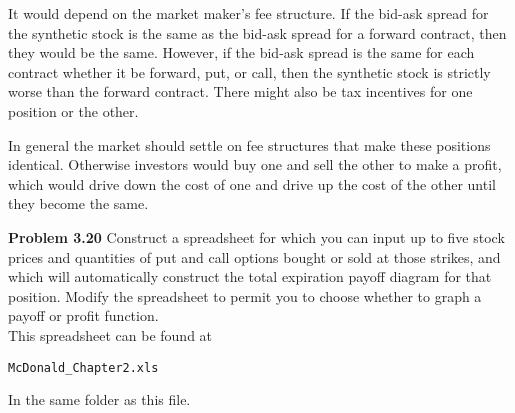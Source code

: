 \documentclass[12pt]{article}
\newcommand{\problem}[1]{\bigskip \noindent \textbf{Problem #1}}
\theoremstyle{plain}
\begin{document}
\begin{enumerate}[(a)]
It would depend on the market maker's fee structure. If the bid-ask spread for the synthetic stock is the same as the bid-ask spread for a forward contract, then they would be the same. However, if the bid-ask spread is the same for each contract whether it be forward, put, or call, then the synthetic stock is strictly worse than the forward contract. There might also be tax incentives for one position or the other.

In general the market should settle on fee structures that make these positions identical. Otherwise investors would buy one and sell the other to make a profit, which would drive down the cost of one and drive up the cost of the other until they become the same.
\end{enumerate}

\problem{3.20} Construct a spreadsheet for which you can input up to five stock prices and quantities of put and call options bought or sold at those strikes, and which will automatically construct the total expiration payoff diagram for that position. Modify the spreadsheet to permit you to choose whether to graph a payoff or profit function.\\

This spreadsheet can be found at
\begin{verbatim}
McDonald_Chapter2.xls
\end{verbatim}
In the same folder as this file.
\end{document}
